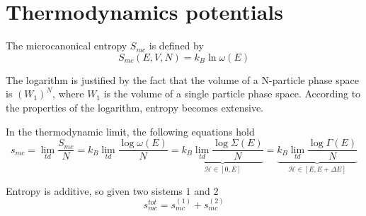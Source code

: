 \section{Thermodynamics potentials}

    The microcanonical entropy $S_{mc}$ is defined by 
    \begin{equation*}
        S_{mc} (E, V, N) = k_B \ln \omega(E)
    \end{equation*}

    The logarithm is justified by the fact that the volume of a N-particle phase space is $(W_1)^N$, where $W_1$ is the volume of a single particle phase space. According to the properties of the logarithm, entropy becomes extensive.

    In the thermodynamic limit, the following equations hold 
    \begin{equation*}
        s_{mc} = \lim_{td} \frac{S_{mc}}{N} = k_B \lim_{td} \frac{\log \omega(E)}{N} = \underbrace{k_B \lim_{td} \frac{\log \Sigma(E)}{N}}_{\mathcal H \in [0, E]} = \underbrace{k_B \lim_{td} \frac{\log \Gamma(E)}{N}}_{\mathcal H \in [E, E + \Delta E]}
    \end{equation*}

    Entropy is additive, so given two sistems $1$ and $2$
    \begin{equation*}
        s_{mc}^{tot} = s_{mc}^{(1)} + s_{mc}^{(2)}
    \end{equation*}

